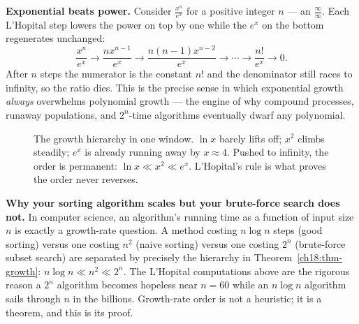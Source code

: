 \begin{focusbox}
\textbf{Exponential beats power.} Consider $\tfrac{x^n}{e^x}$ for a positive integer
$n$ --- an $\tfrac{\infty}{\infty}$. Each L'Hopital step lowers the power on top by one
while the $e^x$ on the bottom regenerates unchanged:
\[
\frac{x^n}{e^x}\to\frac{n x^{n-1}}{e^x}\to\frac{n(n-1)x^{n-2}}{e^x}\to\cdots
\to\frac{n!}{e^x}\to 0.
\]
After $n$ steps the numerator is the constant $n!$ and the denominator still races to
infinity, so the ratio dies. This is the precise sense in which exponential growth
\emph{always} overwhelms polynomial growth --- the engine of why compound processes,
runaway populations, and $2^n$-time algorithms eventually dwarf any polynomial.
\end{focusbox}

\begin{figure}[H]
\centering
{}
\caption{The growth hierarchy in one window. $\ln x$ barely lifts off; $x^2$ climbs
steadily; $e^x$ is already running away by $x\approx 4$. Pushed to infinity, the order
is permanent: $\ln x\ll x^2\ll e^x$. L'Hopital's rule is what proves the order never
reverses.}
\label{ch18:fig-growth}
\end{figure}

\begin{applicationbox}
\textbf{Why your sorting algorithm scales but your brute-force search does not.} In
computer science, an algorithm's running time as a function of input size $n$ is
exactly a growth-rate question. A method costing $n\log n$ steps (good sorting) versus
one costing $n^2$ (naive sorting) versus one costing $2^n$ (brute-force subset search)
are separated by precisely the hierarchy in Theorem~\ref{ch18:thm-growth}:
$n\log n\ll n^2\ll 2^n$. The L'Hopital computations above are the rigorous reason a
$2^n$ algorithm becomes hopeless near $n=60$ while an $n\log n$ algorithm sails through
$n$ in the billions. Growth-rate order is not a heuristic; it is a theorem, and this is
its proof.
\end{applicationbox}

